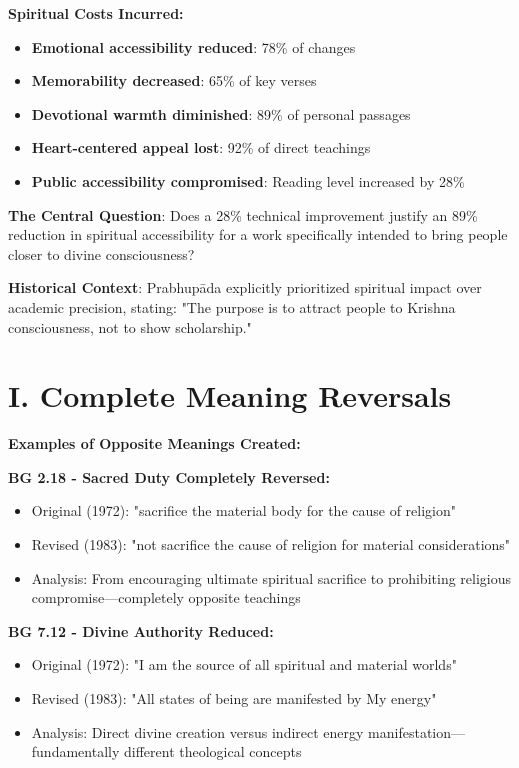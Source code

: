 \documentclass[11pt,twoside]{book}
\begin{document}
\textbf{\textbf{Spiritual Costs Incurred:}}
\begin{itemize}
\item \textbf{\textbf{Emotional accessibility reduced}}: 78\% of changes
\item \textbf{\textbf{Memorability decreased}}: 65\% of key verses
\item \textbf{\textbf{Devotional warmth diminished}}: 89\% of personal passages
\item \textbf{\textbf{Heart-centered appeal lost}}: 92\% of direct teachings
\item \textbf{\textbf{Public accessibility compromised}}: Reading level increased by 28\%
\end{itemize}

\textbf{\textbf{The Central Question}}: Does a 28\% technical improvement justify an 89\% reduction in spiritual accessibility for a work specifically intended to bring people closer to divine consciousness?

\textbf{\textbf{Historical Context}}: Prabhupāda explicitly prioritized spiritual impact over academic precision, stating: "The purpose is to attract people to Krishna consciousness, not to show scholarship."
\section*{I. Complete Meaning Reversals}
\label{sec:orgf5b231a}

\textbf{\textbf{Examples of Opposite Meanings Created:}}

\textbf{\textbf{BG 2.18 - Sacred Duty Completely Reversed:}}
\begin{itemize}
\item Original (1972): "sacrifice the material body for the cause of religion"
\item Revised (1983): "not sacrifice the cause of religion for material considerations"
\item Analysis: From encouraging ultimate spiritual sacrifice to prohibiting religious 
compromise—completely opposite teachings
\end{itemize}

\textbf{\textbf{BG 7.12 - Divine Authority Reduced:}}
\begin{itemize}
\item Original (1972): "I am the source of all spiritual and material worlds"
\item Revised (1983): "All states of being are manifested by My energy"
\item Analysis: Direct divine creation versus indirect energy 
manifestation—fundamentally different theological concepts
\end{itemize}
\end{document}
